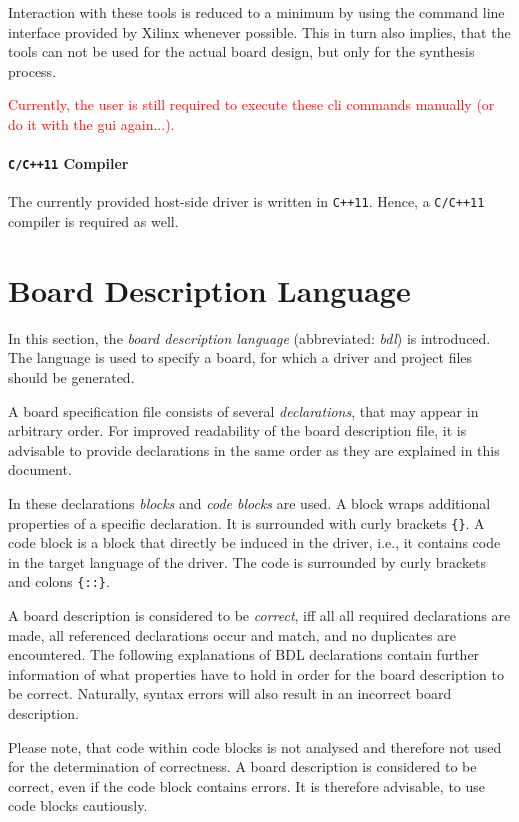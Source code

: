 \documentclass{report}
\begin{document}
Interaction with these tools is reduced to a minimum by using the command line interface provided by Xilinx whenever possible. This in turn also implies, that the tools can not be used for the actual board design, but only for the synthesis process.

 \textcolor{red}{Currently, the user is still required to execute these cli commands manually (or do it with the gui again...).}

\paragraph{\texttt{C/C++11} Compiler}
The currently provided host-side driver is written in \texttt{C++11}. Hence, a \texttt{C/C++11} compiler is required as well.

\section{Board Description Language}
\label{sec:bdl}
In this section, the \textit{board description language} (abbreviated: \textit{bdl}) is introduced. The language is used to specify a board, for which a driver and project files should be generated. 

A board specification file consists of several \textit{declarations}, that may appear in arbitrary order. For improved readability of the board description file, it is advisable to provide declarations in the same order as they are explained in this document.

In these declarations \textit{blocks} and \textit{code blocks} are used. A block wraps additional properties of a specific declaration. It is surrounded with curly brackets \texttt{\{\}}.
A code block is a block that directly be induced in the driver, i.e., it contains code in the target language of the driver. The code is surrounded by curly brackets and colons \texttt{\{::\}}.

A board description is considered to be \textit{correct}, iff all all required declarations are made, all referenced declarations occur and match, and no duplicates are encountered. The following explanations of BDL declarations contain further information of what properties have to hold in order for the board description to be correct. Naturally, syntax errors will also result in an incorrect board description.

Please note, that code within code blocks is not analysed and therefore not used for the determination of correctness. A board description is considered to be correct, even if the code block contains errors. It is therefore advisable, to use code blocks cautiously.
\end{document}
